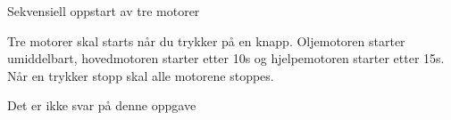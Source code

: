 


Sekvensiell oppstart av tre motorer 

Tre motorer skal starts når du trykker på en knapp. Oljemotoren starter
umiddelbart, hovedmotoren starter etter 10s og hjelpemotoren starter
etter 15s. Når en trykker stopp skal alle motorene stoppes. 

\vskip 10pt





Det er ikke svar på denne oppgave












